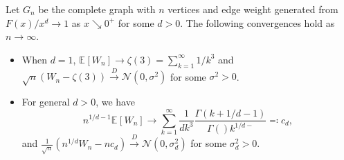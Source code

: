 \begin{theorem}
	Let \(G_n\) be the complete graph with \(n\) vertices and edge weight generated from \(F(x) / x^d \to 1\) as \(x \searrow 0^+\) for some \(d > 0\). The following convergences hold as \(n \to \infty \).
	\begin{itemize}
		\item When \(d = 1\),	\(\mathbb{E}_{}[W_n] \to \zeta (3) = \sum_{k=1}^{\infty} 1 / k^3\) and \(\sqrt{n} (W_n - \zeta (3)) \overset{D}{\to} \mathcal{N} (0, \sigma ^2)\) for some \(\sigma ^2 > 0\).
		\item For general \(d > 0\), we have
		      \[
			      n^{1 / d - 1} \mathbb{E}_{}[W_n]
			      \to \sum_{k=1}^{\infty} \frac{1}{dk^3} \frac{\Gamma (k + 1 / d - 1)}{\Gamma () k^{1 / d - }}
			      \eqqcolon c_d,
		      \]
		      and \(\frac{1}{\sqrt{n} } (n^{1 / d} W_n - n c_d) \overset{D}{\to} \mathcal{N} (0, \sigma _d^2)\) for some \(\sigma _d^2 > 0\).
	\end{itemize}
\end{theorem}
